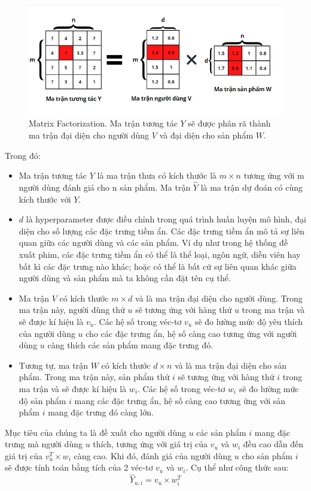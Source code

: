 \begin{figure}[h]
    \centering
    \includegraphics[width = \textwidth]{images/Chapter2/MF1.jpg}
    \caption{Matrix Factorization. Ma trận tương tác $Y$ sẽ được phân rã thành ma trận đại diện cho người dùng $V$ và đại diện cho sản phẩm $W$.}
    \label{fig:chap2_MF1}
\end{figure}
Trong đó:
\begin{itemize}
    \item Ma trận tương tác $Y$ là ma trận thưa có kích thước là $m \times n$ tương ứng với m người dùng đánh giá cho n sản phẩm. Ma trận $\hat{Y}$ là ma trận dự đoán có cùng kích thước với $Y$.
    \item $d$ là hyperparameter được điều chỉnh trong quá trình huấn luyện mô hình, đại diện cho số lượng các đặc trưng tiềm ẩn. Các đặc trưng tiềm ẩn mô tả sự liên quan giữa các người dùng và các sản phẩm. Ví dụ như trong hệ thống đề xuất phim, các đặc trưng tiềm ẩn có thể là thể loại, ngôn ngữ, diễn viên hay bất kì các đặc trưng nào khác; hoặc có thể là bất cứ sự liên quan khác giữa người dùng và sản phẩm mà ta không cần đặt tên cụ thể.
    \item Ma trận $V$ có kích thước $m \times d$ và là ma trận đại diện cho người dùng. Trong ma trận này, người dùng thứ $u$ sẽ tương ứng với hàng thứ $u$ trong ma trận và sẽ được kí hiệu là $v_u$. Các hệ số trong véc-tơ $v_u$ sẽ đo lường mức độ yêu thích của người dùng $u$ cho các đặc trưng ẩn, hệ số càng cao tương ứng với người dùng $u$ càng thích các sản phẩm mang đặc trưng đó.
 
    \item Tương tự, ma trận $W$ có kích thước $d \times n$ và là ma trận đại diện cho sản phẩm. Trong ma trận này, sản phẩm thứ $i$ sẽ tương ứng với hàng thứ $i$ trong ma trận và sẽ được kí hiệu là $w_i$. Các hệ số trong véc-tơ $w_i$ sẽ đo lường mức độ sản phẩm $i$ mang các đặc trưng ẩn, hệ số càng cao tương ứng với sản phẩm $i$ mang đặc trưng đó càng lớn.
\end{itemize}
Mục tiêu của chúng ta là đề xuất cho người dùng $u$ các sản phẩm $i$ mang đặc trưng mà người dùng $u$ thích, tương ứng với giá trị của $v_u$ và $w_i$ đều cao dẫn đến giá trị của $v_u^T\times w_{i}$ càng cao. Khi đó, đánh giá của người dùng $u$ cho sản phẩm $i$ sẽ được tính toán bằng tích của 2 véc-tơ $v_u$ và $w_i$. Cụ thể như công thức sau:
\begin{equation}
\label{eq:2.1_yui_nonbias}
    \hat{Y}_{u,i} = v_{u} \times w_i^T
\end{equation}

